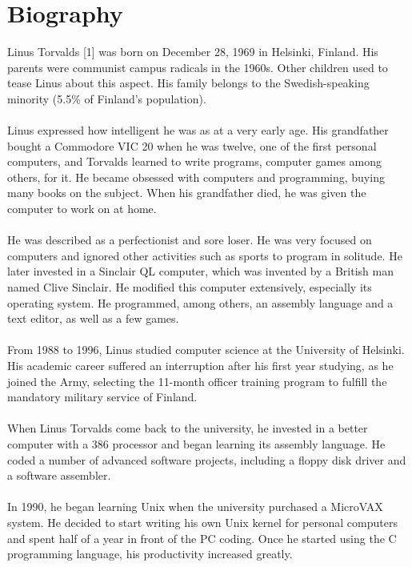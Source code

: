 \documentclass[11pt]{article}
\begin{document}
\pagebreak

\section{Biography}
Linus Torvalds [1] was born on December 28, 1969 in Helsinki, Finland. His parents were communist campus radicals in the 1960s. Other children used to tease Linus about this aspect.  His family belongs to the Swedish-speaking minority (5.5\% of Finland's population).\\ 
\\
Linus expressed how intelligent he was as at a very early age. His grandfather bought a Commodore VIC 20 when he was twelve, one of the first personal computers, and Torvalds learned to write programs, computer games among others, for it. He became obsessed with computers and programming, buying many books on the subject. When his grandfather died, he was given the computer to work on at home.\\
\\
He was described as a perfectionist and sore loser. He was very focused on computers and ignored other activities such as sports to program in solitude. He later invested in a Sinclair QL computer, which was invented by a British man named Clive Sinclair. He modified this computer extensively, especially its operating system. He programmed, among others, an assembly language and a text editor, as well as a few games.\\
\\
From 1988 to 1996, Linus studied computer science at the University of Helsinki. His academic career suffered an interruption after his first year studying, as he joined the Army, selecting the 11-month officer training program to fulfill the mandatory military service of Finland.\\
\\
When Linus Torvalds come back to the university, he invested in a better computer with a 386 processor and began learning its assembly language. He coded a number of advanced software projects, including a floppy disk driver and a software assembler.\\
\\
In 1990, he began learning Unix when the university purchased a MicroVAX system. He decided to start writing his own Unix kernel for personal computers and spent half of a year in front of the PC coding. Once he started using the C programming language, his productivity increased greatly.\\
\end{document}
